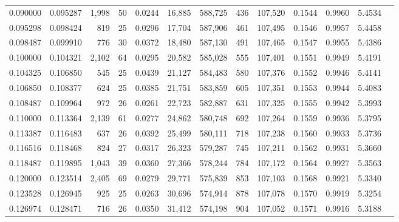 \begin{tabular}{rrrrrrrrrrrrr}
0.090000 & 0.095287 & 1,998 &  50 &                                     0.0244 &  16,885 & 588,725 &     436 & 107,520 & 0.1544 & 0.9960 & 5.4534 \\
0.095298 & 0.098424 &   819 &  25 &                                     0.0296 &  17,704 & 587,906 &     461 & 107,495 & 0.1546 & 0.9957 & 5.4458 \\
0.098487 & 0.099910 &   776 &  30 &                                     0.0372 &  18,480 & 587,130 &     491 & 107,465 & 0.1547 & 0.9955 & 5.4386 \\
0.100000 & 0.104321 & 2,102 &  64 &                                     0.0295 &  20,582 & 585,028 &     555 & 107,401 & 0.1551 & 0.9949 & 5.4191 \\
0.104325 & 0.106850 &   545 &  25 &                                     0.0439 &  21,127 & 584,483 &     580 & 107,376 & 0.1552 & 0.9946 & 5.4141 \\
0.106850 & 0.108377 &   624 &  25 &                                     0.0385 &  21,751 & 583,859 &     605 & 107,351 & 0.1553 & 0.9944 & 5.4083 \\
0.108487 & 0.109964 &   972 &  26 &                                     0.0261 &  22,723 & 582,887 &     631 & 107,325 & 0.1555 & 0.9942 & 5.3993 \\
0.110000 & 0.113364 & 2,139 &  61 &                                     0.0277 &  24,862 & 580,748 &     692 & 107,264 & 0.1559 & 0.9936 & 5.3795 \\
0.113387 & 0.116483 &   637 &  26 &                                     0.0392 &  25,499 & 580,111 &     718 & 107,238 & 0.1560 & 0.9933 & 5.3736 \\
0.116516 & 0.118468 &   824 &  27 &                                     0.0317 &  26,323 & 579,287 &     745 & 107,211 & 0.1562 & 0.9931 & 5.3660 \\
0.118487 & 0.119895 & 1,043 &  39 &                                     0.0360 &  27,366 & 578,244 &     784 & 107,172 & 0.1564 & 0.9927 & 5.3563 \\
0.120000 & 0.123514 & 2,405 &  69 &                                     0.0279 &  29,771 & 575,839 &     853 & 107,103 & 0.1568 & 0.9921 & 5.3340 \\
0.123528 & 0.126945 &   925 &  25 &                                     0.0263 &  30,696 & 574,914 &     878 & 107,078 & 0.1570 & 0.9919 & 5.3254 \\
0.126974 & 0.128471 &   716 &  26 &                                     0.0350 &  31,412 & 574,198 &     904 & 107,052 & 0.1571 & 0.9916 & 5.3188 \\

\end{tabular}
